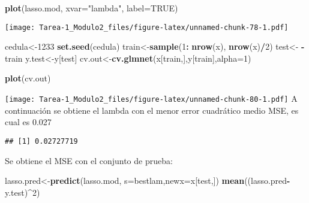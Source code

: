 \documentclass[
]{article}
\newenvironment{Shaded}{\begin{snugshade}}{\end{snugshade}}
\newcommand{\DataTypeTok}[1]{\textcolor[rgb]{0.13,0.29,0.53}{#1}}
\newcommand{\DecValTok}[1]{\textcolor[rgb]{0.00,0.00,0.81}{#1}}
\newcommand{\KeywordTok}[1]{\textcolor[rgb]{0.13,0.29,0.53}{\textbf{#1}}}
\newcommand{\NormalTok}[1]{#1}
\newcommand{\OperatorTok}[1]{\textcolor[rgb]{0.81,0.36,0.00}{\textbf{#1}}}
\newcommand{\OtherTok}[1]{\textcolor[rgb]{0.56,0.35,0.01}{#1}}
\newcommand{\StringTok}[1]{\textcolor[rgb]{0.31,0.60,0.02}{#1}}
\begin{document}
\begin{Shaded}
\begin{Highlighting}[]
\KeywordTok{plot}\NormalTok{(lasso.mod, }\DataTypeTok{xvar=}\StringTok{"lambda"}\NormalTok{, }\DataTypeTok{label=}\OtherTok{TRUE}\NormalTok{)}
\end{Highlighting}
\end{Shaded}

\texttt{[image: Tarea-1\_Modulo2\_files/figure-latex/unnamed-chunk-78-1.pdf]}

\begin{Shaded}
\begin{Highlighting}[]
\NormalTok{cedula<-}\DecValTok{1233}
\KeywordTok{set.seed}\NormalTok{(cedula)}
\NormalTok{train<-}\KeywordTok{sample}\NormalTok{(}\DecValTok{1}\OperatorTok{:}\StringTok{ }\KeywordTok{nrow}\NormalTok{(x), }\KeywordTok{nrow}\NormalTok{(x)}\OperatorTok{/}\DecValTok{2}\NormalTok{)}
\NormalTok{test<-}\StringTok{ }\OperatorTok{-}\NormalTok{train}
\NormalTok{y.test<-y[test] }
\NormalTok{cv.out<-}\KeywordTok{cv.glmnet}\NormalTok{(x[train,],y[train],}\DataTypeTok{alpha=}\DecValTok{1}\NormalTok{)}
\end{Highlighting}
\end{Shaded}

\begin{Shaded}
\begin{Highlighting}[]
\KeywordTok{plot}\NormalTok{(cv.out)}
\end{Highlighting}
\end{Shaded}

\texttt{[image: Tarea-1\_Modulo2\_files/figure-latex/unnamed-chunk-80-1.pdf]}
A continuación se obtiene el lambda con el menor error cuadrático medio
MSE, es cual es 0.027

\begin{Shaded}
\end{Shaded}

\begin{verbatim}
## [1] 0.02727719
\end{verbatim}

Se obtiene el MSE con el conjunto de prueba:

\begin{Shaded}
\begin{Highlighting}[]
\NormalTok{lasso.pred<-}\KeywordTok{predict}\NormalTok{(lasso.mod, }\DataTypeTok{s=}\NormalTok{bestlam,}\DataTypeTok{newx=}\NormalTok{x[test,]) }
\KeywordTok{mean}\NormalTok{((lasso.pred}\OperatorTok{-}\NormalTok{y.test)}\OperatorTok{^}\DecValTok{2}\NormalTok{)}
\end{Highlighting}
\end{Shaded}
\end{document}

